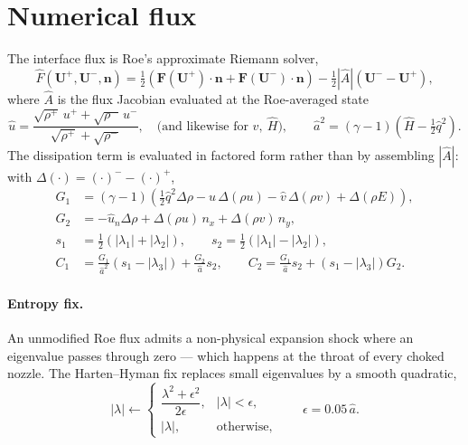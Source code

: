 \documentclass[11pt,a4paper]{article}
\newcommand{\vect}[1]{\boldsymbol{#1}}
\newcommand{\Uvec}{\vect{U}}
\newcommand{\Fvec}{\vect{F}}
\newcommand{\nvec}{\vect{n}}
\begin{document}
\section{Numerical flux}

The interface flux is Roe's approximate Riemann solver,
\begin{equation}
  \hat{F}(\Uvec^{+}, \Uvec^{-}, \nvec)
  = \tfrac{1}{2}\left(\Fvec(\Uvec^{+})\!\cdot\!\nvec
                    + \Fvec(\Uvec^{-})\!\cdot\!\nvec\right)
  - \tfrac{1}{2}\left|\hat{A}\right| \left(\Uvec^{-} - \Uvec^{+}\right),
  \label{eq:roe}
\end{equation}
where $\hat{A}$ is the flux Jacobian evaluated at the Roe-averaged state
\begin{equation}
  \hat{u} = \frac{\sqrt{\rho^{+}}\,u^{+} + \sqrt{\rho^{-}}\,u^{-}}
                 {\sqrt{\rho^{+}} + \sqrt{\rho^{-}}},
  \quad \text{(and likewise for } \hat{v},\ \hat{H}\text{)},
  \qquad
  \hat{a}^{2} = (\gamma - 1)\left(\hat{H} - \tfrac{1}{2}\hat{q}^{2}\right).
\end{equation}
The dissipation term is evaluated in factored form rather than by assembling
$|\hat{A}|$: with
$\Delta(\cdot) = (\cdot)^{-} - (\cdot)^{+}$,
\begin{align}
  G_1 &= (\gamma-1)\left(\tfrac{1}{2}\hat{q}^{2}\Delta\rho
         - \hat{u}\,\Delta(\rho u) - \hat{v}\,\Delta(\rho v) + \Delta(\rho E)\right),\\
  G_2 &= -\hat{u}_n \Delta\rho + \Delta(\rho u)\, n_x + \Delta(\rho v)\, n_y,\\
  s_1 &= \tfrac{1}{2}\left(|\lambda_1| + |\lambda_2|\right), \qquad
  s_2 = \tfrac{1}{2}\left(|\lambda_1| - |\lambda_2|\right),\\
  C_1 &= \frac{G_1}{\hat{a}^{2}}\left(s_1 - |\lambda_3|\right) + \frac{G_2}{\hat{a}} s_2,
  \qquad
  C_2 = \frac{G_1}{\hat{a}} s_2 + \left(s_1 - |\lambda_3|\right) G_2 .
\end{align}

\paragraph{Entropy fix.}
An unmodified Roe flux admits a non-physical expansion shock where an eigenvalue
passes through zero --- which happens at the throat of every choked nozzle.  The
Harten--Hyman fix replaces small eigenvalues by a smooth quadratic,
\begin{equation}
  |\lambda| \leftarrow
  \begin{cases}
    \dfrac{\lambda^{2} + \epsilon^{2}}{2\epsilon}, & |\lambda| < \epsilon,\\[8pt]
    |\lambda|, & \text{otherwise},
  \end{cases}
  \qquad \epsilon = 0.05\,\hat{a}.
  \label{eq:entropyfix}
\end{equation}
\end{document}
